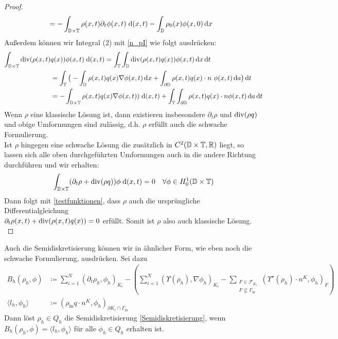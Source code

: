 \begin{proof}
\begin{align*}
	&= - \int_{\mathbb{D} \times \mathbb{T}} \rho(x,t) \partial_t \phi(x,t) \; \mathrm{d} (x,t) - \int_{\mathbb{D}} \rho_0(x) \phi(x,0) \, \mathrm{d} x 
	\end{align*}
	Außerdem können wir Integral (2) mit  \ref{n_pI} wie folgt ausdrücken:
	\begin{align*}
	\int_{\mathbb{D} \times \mathbb{T}}  
	\operatorname{div}(\rho(x,t) &q(x) ) \phi(x,t)\; \mathrm{d} (x,t) = \int_{\mathbb{T}} \int_{\mathbb{D}} \operatorname{div}(\rho(x,t) q(x) ) \phi(x,t) \, \mathrm{d} x \, \mathrm{d} t \\
	&= \int_{\mathbb{T}} \big( - \int_{\mathbb{D}} \rho(x,t) q(x) \nabla \phi(x,t) \, \mathrm{d} x + \int_{\partial \mathbb{D}} \rho(x,t) q(x) \cdot n \ \phi(x,t) \, \mathrm{d} a \big)  \, \mathrm{d} t \\
	&= - \int_{\mathbb{D} \times \mathbb{T}} \rho(x,t) q(x) \nabla \phi(x,t)) \; \mathrm{d} (x,t) + \int_{\mathbb{T}} \int_{\partial \mathbb{D}} \rho(x,t) q(x) \cdot n \phi(x,t) \, \mathrm{d} a \, \mathrm{d} t 
	\end{align*}
	Wenn $ \rho  $ eine klassische Lösung ist, dann existieren insbesondere $ \partial_t \rho  $ und $ \operatorname{div}(\rho q) $ und obige Umformungen sind zulässig, d.h. $ \rho $ erfüllt auch die schwache Formulierung. \\
	Ist $ \rho $ hingegen eine schwache Lösung die zusätzlich in $ C^2(\mathbb{D}\times\mathbb{T},\mathbb{R}) $ liegt, so lassen sich alle oben durchgeführten Umformungen auch in die andere Richtung durchführen und wir erhalten: 
	\[
	\int_{\mathbb{D}\times\mathbb{T}} (\partial_t\rho + \operatorname{div}(\rho q))\phi \; \mathrm{d} (x,t) = 0 \quad \forall \phi \in H_0^1(\mathbb{D}\times\mathbb{T}) 
	\] 
	Dann folgt mit \ref{testfunktionen}, dass $ \rho $ auch die ursprüngliche Differentialgleichung\\
	$ \partial_t \rho(x,t) + \operatorname{div}(\rho(x,t) q(x)) = 0  $ erfüllt. Somit ist $ \rho $ also auch klassische Lösung.\\
	
\end{proof}

Auch die Semidiskretisierung können wir in ähnlicher Form, wie eben noch die schwache Formulierung, ausdrücken. Sei dazu
\begin{align*}
B_h(\rho_h,\phi) &\coloneqq \sum_{i=1}^{N} (\partial_t\rho_{h},\phi_h)_{K_i}  - \left( \sum_{i=1}^{N} (\Upsilon(\rho_h),\nabla \phi_h)_{K_i} - \sum_{\substack{F \in \mathcal{F}_{K_i} \\ F \not\subseteq \Gamma_{\text{in}}}} (\Upsilon^{\star}(\rho_h)\cdot n^K,\phi_h)_F\right) \\
\langle l_h , \phi_h \rangle &\coloneqq (\rho_{\text{in}}q \cdot n^K,\phi_h)_{\partial K_i \cap \Gamma_{\text{in}}}
\end{align*}
Dann löst $ \rho_h \in Q_h $ die Semidiskretisierung \ref{Semidiskretisierung}, wenn $ B_h(\rho_{h},\phi) = \langle l_h,\phi_h \rangle  $ für alle $ \phi_h \in Q_h$ erhalten ist.



